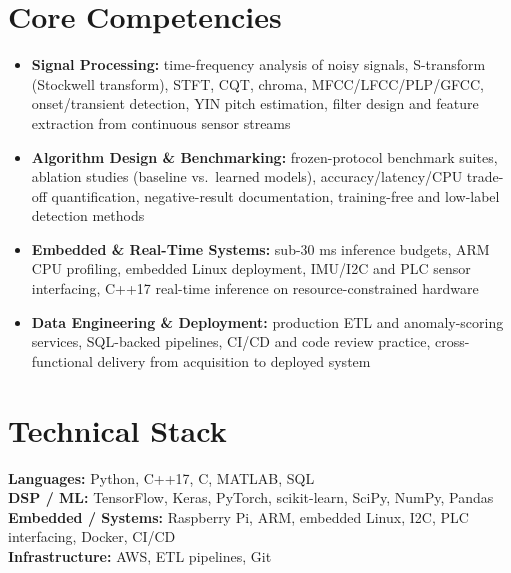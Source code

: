 \documentclass[11pt]{article}
\begin{document}
\section*{Core Competencies}
\begin{itemize}[leftmargin=2em, itemsep=-0.3em, topsep=0.2em]
    \item \textbf{Signal Processing:} time-frequency analysis of noisy signals, S-transform (Stockwell transform), STFT, CQT, chroma, MFCC/LFCC/PLP/GFCC, onset/transient detection, YIN pitch estimation, filter design and feature extraction from continuous sensor streams
    \item \textbf{Algorithm Design \& Benchmarking:} frozen-protocol benchmark suites, ablation studies (baseline vs.\ learned models), accuracy/latency/CPU trade-off quantification, negative-result documentation, training-free and low-label detection methods
    \item \textbf{Embedded \& Real-Time Systems:} sub-30 ms inference budgets, ARM CPU profiling, embedded Linux deployment, IMU/I2C and PLC sensor interfacing, C++17 real-time inference on resource-constrained hardware
    \item \textbf{Data Engineering \& Deployment:} production ETL and anomaly-scoring services, SQL-backed pipelines, CI/CD and code review practice, cross-functional delivery from acquisition to deployed system
\end{itemize}

\section*{Technical Stack}
\textbf{Languages:} Python, C++17, C, MATLAB, SQL \\
\textbf{DSP / ML:} TensorFlow, Keras, PyTorch, scikit-learn, SciPy, NumPy, Pandas \\
\textbf{Embedded / Systems:} Raspberry Pi, ARM, embedded Linux, I2C, PLC interfacing, Docker, CI/CD \\
\textbf{Infrastructure:} AWS, ETL pipelines, Git
\end{document}
